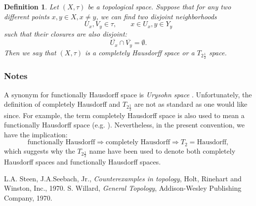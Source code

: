 \documentclass[12pt]{article}
\newtheorem{defn}{Definition}
\begin{document}
\begin{defn} \cite{steen}
Let $(X,\tau)$ be a topological space. 
Suppose that for any two different points $x,y\in X, x\neq y$, 
we can find two disjoint neighborhoods 
\[U_x,V_y\in \tau,\qquad x\in U_x, y\in Y_y\] such that their 
closures are also disjoint: 
\[\overline{U_x}\cap \overline{V_y}=\emptyset.\]
Then we say that $(X,\tau)$ is a 
\emph{completely Hausdorff space} or a \emph{$T_{2\frac12}$ space}. 
\end{defn}

\subsubsection*{Notes}
A synonym for functionally Hausdorff space is 
   \emph{Urysohn space} \cite{steen}. 
Unfortunately, the definition of completely Hausdorff and $T_{2\frac12}$ 
are not as standard as one would like since. For example, the
term completely Hausdorff space is also used to mean 
a functionally Hausdorff space (e.g. \cite{willard}).
Nevertheless, in the present convention, we have the implication:
\[
  \mbox{functionally Hausdorff}
    \Rightarrow
  \mbox{completely Hausdorff}
    \Rightarrow 
  T_2=\mbox{Hausdorff},
\]
which suggests why the $T_{2\frac12}$ name have been used to 
denote both completely Hausdorff spaces and functionally Hausdorff spaces.

\begin{thebibliography}{9}
 L.A. Steen, J.A.Seebach, Jr.,
\emph{Counterexamples in topology},
Holt, Rinehart and Winston, Inc., 1970.
 S. Willard, \emph{General Topology},
Addison-Wesley Publishing Company, 1970.
\end{thebibliography}
\end{document}
